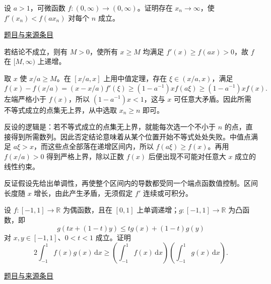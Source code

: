 \documentclass[UTF8,12pt,a4paper,fontset=fandol]{ctexart}
\begin{document}
\begin{example}[来源序号4]\label{ex:pre05-math:4}\label{pr:pre05-math:4}

设 $a>1$，可微函数 $f:(0,\infty)\to(0,\infty)$。证明存在 $x_n\to\infty$，使 $f'(x_n)<f(ax_n)$ 对每个 $n$ 成立。

\par\href{https://github.com/lzxcr/cmc-mathematics/blob/64916fa1fdbc3e444a652eca204d5669058ee321/src/problems/preliminary/05/04.md}{题目与来源条目}

\end{example}

\begin{solve}\label{ans:pre05-math:4}

若结论不成立，则有 $M>0$，使所有 $x\ge M$ 均满足 $f'(x)\ge f(ax)>0$，故 $f$ 在 $[M,\infty)$ 上递增。

取 $x$ 使 $x/a\ge M$。在 $[x/a,x]$ 上用中值定理，存在 $\xi\in(x/a,x)$，满足
\[
f(x)-f(x/a)=(x-x/a)f'(\xi)
\ge(1-a^{-1})x f(a\xi)
\ge(1-a^{-1})x f(x).
\]
左端严格小于 $f(x)$，所以 $(1-a^{-1})x<1$，这与 $x$ 可任意大矛盾。因此所需不等式成立的点集无上界，从中选取 $x_n\ge n$ 即可。

反设的逻辑是：若不等式成立的点集无上界，就能每次选一个不小于 $n$ 的点，直接得到所需数列。因此否定结论意味着从某个位置开始不等式处处失败。中值点满足 $a\xi>x$，而这些点全部落在递增区间内，所以 $f(a\xi)\ge f(x)$。再用 $f(x/a)>0$ 得到严格上界，除以正数 $f(x)$ 后便出现不可能对任意大 $x$ 成立的线性约束。

\end{solve}

\begin{remark}[方法与条件]反证假设先给出单调性，再使整个区间内的导数都受同一个端点函数值控制。区间长度随 $x$ 增长，由此产生矛盾，无须假定 $f'$ 连续或可积分。\end{remark}

\begin{example}[来源序号5]\label{ex:pre05-math:5}\label{pr:pre05-math:5}

设 $f:[-1,1]\to\mathbb R$ 为偶函数，且在 $[0,1]$ 上单调递增；$g:[-1,1]\to\mathbb R$ 为凸函数，即
\[
g(tx+(1-t)y)\le tg(x)+(1-t)g(y)
\]
对 $x,y\in[-1,1]$、$0<t<1$ 成立。证明
\[
2\int_{-1}^1f(x)g(x)\,\mathrm dx
\ge\left(\int_{-1}^1f(x)\,\mathrm dx\right)
\left(\int_{-1}^1g(x)\,\mathrm dx\right).
\]

\par\href{https://github.com/lzxcr/cmc-mathematics/blob/64916fa1fdbc3e444a652eca204d5669058ee321/src/problems/preliminary/05/05.md}{题目与来源条目}

\end{example}
\end{document}
